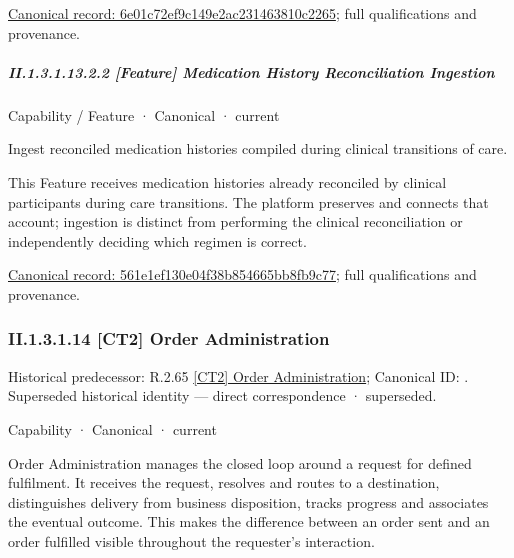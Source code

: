 {\footnotesize \href{../../../../continuum/strategy/capability/feature/6e01c72ef9c149e2ac231463810c2265.md}{Canonical record: 6e01c72ef9c149e2ac231463810c2265}; full qualifications and provenance.}\par
\subparagraph*{II.1.3.1.13.2.2 [Feature] Medication History Reconciliation Ingestion}
\label{navigation:II.1.3.1.13.2.2}

\label{element:561e1ef130e04f38b854665bb8fb9c77}
{\small Capability / Feature · Canonical · current}\par

Ingest reconciled medication histories compiled during clinical transitions of care.



This Feature receives medication histories already reconciled by clinical participants during care transitions. The platform preserves and connects that account; ingestion is distinct from performing the clinical reconciliation or independently deciding which regimen is correct.


{\footnotesize \href{../../../../continuum/strategy/capability/feature/561e1ef130e04f38b854665bb8fb9c77.md}{Canonical record: 561e1ef130e04f38b854665bb8fb9c77}; full qualifications and provenance.}\par
\subsubsection*{II.1.3.1.14 [CT2] Order Administration}
\label{navigation:II.1.3.1.14}

{\small Historical predecessor: R.2.65 \hyperref[element:ebb735a2915744819d4001d9b8425cc6]{[CT2] Order Administration}; Canonical ID: \texttt{}. Superseded historical identity — direct correspondence · superseded.}\par
\label{element:c3c5abd7987f4433a46cbfed8167914c}
{\small Capability · Canonical · current}\par

Order Administration manages the closed loop around a request for defined fulfilment. It receives the request, resolves and routes to a destination, distinguishes delivery from business disposition, tracks progress and associates the eventual outcome. This makes the difference between an order sent and an order fulfilled visible throughout the requester's interaction.



